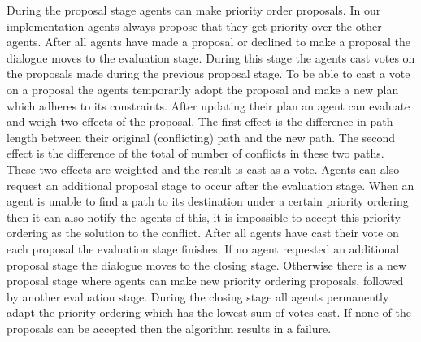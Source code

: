 During the proposal stage agents can make priority order proposals. In our
implementation agents always propose that they get priority over the other
agents. After all agents have made a proposal or declined to make a proposal
the dialogue moves to the evaluation stage. During this stage the agents cast
votes on the proposals made during the previous proposal stage. To be able to 
cast a
vote on a proposal the agents temporarily adopt the proposal and make a new
plan which adheres to its constraints. After updating their plan an agent can
evaluate and weigh two effects of the proposal. The first effect is the
difference in path length between their original (conflicting) path and the new
path. The second effect is the difference of the total of number of conflicts
in these two paths. These two effects are weighted and the result is cast as a
vote. Agents can also request an additional proposal stage to occur after the
evaluation stage. When an agent is unable to find a path to its destination
under a certain priority ordering then it can also notify the agents of this,
it is impossible to accept this priority ordering as the solution to the
conflict. After all agents have cast their vote on each proposal the evaluation
stage finishes. If no agent requested an additional proposal stage the dialogue
moves to the closing stage. Otherwise there is a new proposal stage where
agents can make new priority ordering proposals, followed by another evaluation
stage. During the closing stage all agents permanently adapt the priority
ordering which has the lowest sum of votes cast. If none of the proposals can
be accepted then the algorithm results in a failure.


